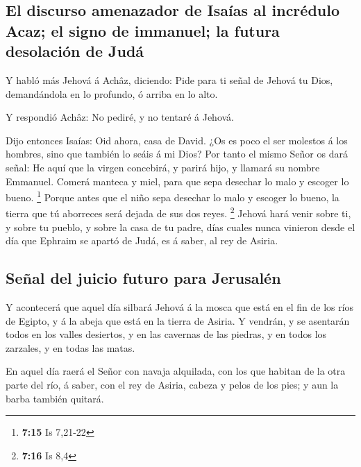 \hypertarget{el-discurso-amenazador-de-isauxedas-al-incruxe9dulo-acaz-el-signo-de-immanuel-la-futura-desolaciuxf3n-de-juduxe1}{%
\subsection{El discurso amenazador de Isaías al incrédulo Acaz; el signo
de immanuel; la futura desolación de
Judá}\label{el-discurso-amenazador-de-isauxedas-al-incruxe9dulo-acaz-el-signo-de-immanuel-la-futura-desolaciuxf3n-de-juduxe1}}

 Y habló más Jehová á Achâz, diciendo: 
Pide para ti señal de Jehová tu Dios, demandándola en lo profundo, ó
arriba en lo alto.

 Y respondió Achâz: No pediré, y no tentaré á Jehová.

 Dijo entonces Isaías: Oid ahora, casa de David. ¿Os es
poco el ser molestos á los hombres, sino que también lo seáis á mi Dios?
 Por tanto el mismo Señor os dará señal: He aquí que la
virgen concebirá, y parirá hijo, y llamará su nombre Emmanuel.
 Comerá manteca y miel, para que sepa desechar lo malo y
escoger lo bueno. \footnote{\textbf{7:15} Is 7,21-22} 
Porque antes que el niño sepa desechar lo malo y escoger lo bueno, la
tierra que tú aborreces será dejada de sus dos reyes. \footnote{\textbf{7:16}
  Is 8,4}  Jehová hará venir sobre ti, y sobre tu pueblo,
y sobre la casa de tu padre, días cuales nunca vinieron desde el día que
Ephraim se apartó de Judá, es á saber, al rey de Asiria.

\hypertarget{seuxf1al-del-juicio-futuro-para-jerusaluxe9n}{%
\subsection{Señal del juicio futuro para
Jerusalén}\label{seuxf1al-del-juicio-futuro-para-jerusaluxe9n}}

 Y acontecerá que aquel día silbará Jehová á la mosca que
está en el fin de los ríos de Egipto, y á la abeja que está en la tierra
de Asiria.  Y vendrán, y se asentarán todos en los valles
desiertos, y en las cavernas de las piedras, y en todos los zarzales, y
en todas las matas.

 En aquel día raerá el Señor con navaja alquilada, con
los que habitan de la otra parte del río, á saber, con el rey de Asiria,
cabeza y pelos de los pies; y aun la barba también quitará.

